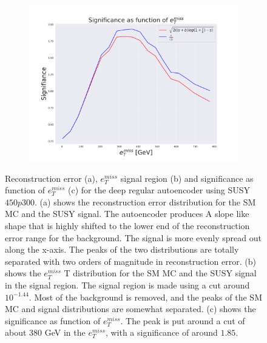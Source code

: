 \begin{figure}[H]
    \begin{subfigure}{.49\textwidth}
        \includegraphics[width=\textwidth]{Figures/AE_testing/big/2lep/significance_etmiss_450p0p0300_-1.4360553938127363.pdf}
        \caption{}
        \label{fig:AE_2lep_big_signi_450}
    \end{subfigure}
    \hfill      
    \caption[2lep deep network | $450p300$ | AE]{Reconstruction error (a), $e_T^{miss}$ signal region (b) and significance as function of 
    $e_T^{miss}$ (c) for the deep regular autoencoder using SUSY $450p300$. 
    (a) shows the reconstruction error distribution for the SM MC and the SUSY signal. 
    The autoencoder produces A slope like shape that is highly shifted to the lower end of the reconstruction error range
for the background. The signal is more evenly spread out along the x-axis. The peaks of the two distributions are totally separated
with two orders of magnitude in reconstruction error. (b) shows the $e_T^{miss}$
T distribution for the SM MC and the SUSY signal in the signal region. The signal region is made using a cut around
$10^{-1.44}$. Most of the background is removed, and the peaks of the SM MC and signal distributions are
somewhat separated. (c) shows the significance as function of $e_T^{miss}$. The peak is put 
around a cut of about 380 GeV in the $e_T^{miss}$, with a significance of around $1.85$.}
    \label{fig:AE_2lep_big_rec_sig_signi_450}
\end{figure}



